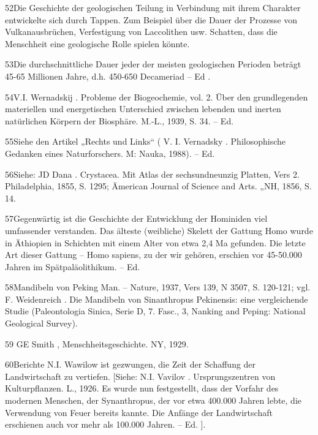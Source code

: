\documentclass[11pt,a4paper]{book}
\begin{document}
52Die Geschichte der geologischen Teilung in Verbindung mit ihrem Charakter entwickelte sich durch Tappen. Zum Beispiel über die Dauer der Prozesse von Vulkanausbrüchen, Verfestigung von Laccolithen usw. Schatten, dass die Menschheit eine geologische Rolle spielen könnte.



53Die durchschnittliche Dauer jeder der meisten geologischen Perioden beträgt 45-65 Millionen Jahre, d.h. 450-650 Decameriad -- Ed .



54V.I. Wernadskij . Probleme der Biogeochemie, vol. 2. Über den grundlegenden materiellen und energetischen Unterschied zwischen lebenden und inerten natürlichen Körpern der Biosphäre. M.-L., 1939, S. 34. -- Ed.



55Siehe den Artikel „Rechts und Links“ ( V. I. Vernadsky . Philosophische Gedanken eines Naturforschers. M: Nauka, 1988). -- Ed.



56Siehe: JD Dana . Crystacea. Mit Atlas der sechsundneunzig Platten, Vers 2. Philadelphia, 1855, S. 1295; Ämerican Journal of Science and Arts. „NH, 1856, S. 14.



57Gegenwärtig ist die Geschichte der Entwicklung der Hominiden viel umfassender verstanden. Das älteste (weibliche) Skelett der Gattung Homo wurde in Äthiopien in Schichten mit einem Alter von etwa 2,4 Ma gefunden. Die letzte Art dieser Gattung -- Homo sapiens, zu der wir gehören, erschien vor 45-50.000 Jahren im Spätpaläolithikum. -- Ed.



58Mandibeln von Peking Man. -- Nature, 1937, Vers 139, N 3507, S. 120-121; vgl. F. Weidenreich . Die Mandibeln von Sinanthropus Pekinensis: eine vergleichende Studie (Paleontologia Sinica, Serie D, 7. Fasc., 3, Nanking and Peping: National Geological Survey).



59 GE Smith , Menschheitsgeschichte. NY, 1929.



60Berichte N.I. Wawilow ist gezwungen, die Zeit der Schaffung der Landwirtschaft zu vertiefen. [Siehe: N.I. Vavilov . Ursprungszentren von Kulturpflanzen. L., 1926. Es wurde nun festgestellt, dass der Vorfahr des modernen Menschen, der Synanthropus, der vor etwa 400.000 Jahren lebte, die Verwendung von Feuer bereits kannte. Die Anfänge der Landwirtschaft erschienen auch vor mehr als 100.000 Jahren. -- Ed. ].
\end{document}
